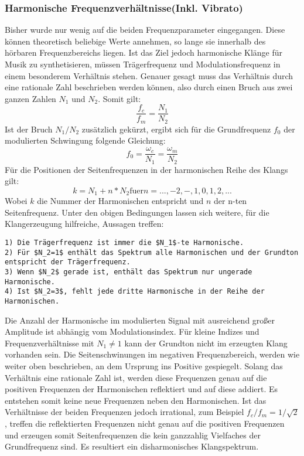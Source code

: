 \subsubsection{Harmonische Frequenzverhältnisse(Inkl. Vibrato)}
Bisher wurde nur wenig auf die beiden Frequenzparameter eingegangen. Diese können theoretisch beliebige Werte annehmen, so lange sie innerhalb des hörbaren Frequenzbereichs liegen. Ist das Ziel jedoch harmonische Klänge für Musik zu synthetisieren, müssen Trägerfrequenz und Modulationsfrequenz in einem besonderem Verhältnis stehen. Genauer gesagt muss das Verhältnis durch eine rationale Zahl beschrieben werden können, also durch einen Bruch aus zwei ganzen Zahlen $N_1$ und $N_2$. Somit gilt:
\begin{equation*}
\frac{f_c}{f_m}=\frac{N_1}{N_2}
\end{equation*}
Ist der Bruch $N_1/N_2$ zusätzlich gekürzt, ergibt sich für die Grundfrequenz $f_0$ der modulierten Schwingung folgende Gleichung:
\begin{equation*}
f_0=\frac{\omega_c}{N_1}=\frac{\omega_m}{N_2}
\end{equation*}
Für die Positionen der Seitenfrequenzen in der harmonischen Reihe des Klangs gilt:
\begin{equation*}
k=N_1+n*N_2 \mbox{fuer} n=...,-2,-,1,0,1,2,...
\end{equation*}
Wobei $k$ die Nummer der Harmonischen entspricht und $n$ der n-ten Seitenfrequenz. Unter den obigen Bedingungen lassen sich weitere, für die Klangerzeugung hilfreiche, Aussagen treffen: \cite{chowningPaper}
\begin{lstlisting}[mathescape]
1) Die Trägerfrequenz ist immer die $N_1$-te Harmonische.
2) Für $N_2=1$ enthält das Spektrum alle Harmonischen und der Grundton entspricht der Trägerfrequenz.
3) Wenn $N_2$ gerade ist, enthält das Spektrum nur ungerade Harmonische.
4) Ist $N_2=3$, fehlt jede dritte Harmonische in der Reihe der Harmonischen.
\end{lstlisting}
Die Anzahl der Harmonische im modulierten Signal mit ausreichend großer Amplitude ist abhängig vom Modulationsindex. Für kleine Indizes und Frequenzverhältnisse mit $N_1\neq1$ kann der Grundton nicht im erzeugten Klang vorhanden sein. Die Seitenschwinungen im negativen Frequenzbereich, werden wie weiter oben beschrieben, an dem Ursprung ins Positive gespiegelt. Solang das Verhältnis eine rationale Zahl ist, werden diese Frequenzen genau auf die positiven Frequenzen der Harmonischen reflektiert und auf diese addiert.
Es entstehen somit keine neue Frequenzen neben den Harmonischen. Ist das Verhältnisse der beiden Frequenzen jedoch irrational, 
zum Beispiel $f_c/f_m=1/\sqrt{2}$, treffen die reflektierten Frequenzen nicht genau auf die positiven Frequenzen und erzeugen somit Seitenfrequenzen die kein ganzzahlig Vielfaches der Grundfrequenz sind. Es resultiert ein disharmonisches Klangspektrum.


